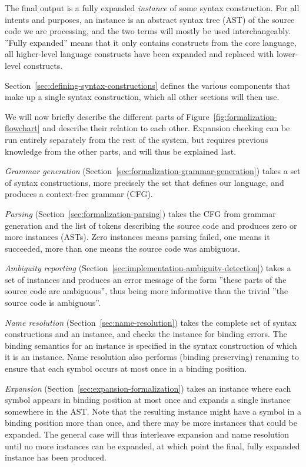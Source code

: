 \documentclass{kththesis}
\begin{document}
The final output is a fully expanded \emph{instance} of some syntax construction. For all intents and purposes, an instance is an abstract syntax tree (AST) of the source code we are processing, and the two terms will mostly be used interchangeably. ''Fully expanded'' means that it only contains constructs from the core language, all higher-level language constructs have been expanded and replaced with lower-level constructs.

Section~\ref{sec:defining-syntax-constructions} defines the various components that make up a single syntax construction, which all other sections will then use.

We will now briefly describe the different parts of Figure~\ref{fig:formalization-flowchart} and describe their relation to each other. Expansion checking can be run entirely separately from the rest of the system, but requires previous knowledge from the other parts, and will thus be explained last.

\emph{Grammar generation} (Section~\ref{sec:formalization-grammar-generation}) takes a set of syntax constructions, more precisely the set that defines our language, and produces a context-free grammar (CFG).

\emph{Parsing} (Section~\ref{sec:formalization-parsing}) takes the CFG from grammar generation and the list of tokens describing the source code and produces zero or more instances (ASTs). Zero instances means parsing failed, one means it succeeded, more than one means the source code was ambiguous.

\emph{Ambiguity reporting} (Section~\ref{sec:implementation-ambiguity-detection}) takes a set of instances and produces an error message of the form ''these parts of the source code are ambiguous'', thus being more informative than the trivial ''the source code is ambiguous''.

\emph{Name resolution} (Section~\ref{sec:name-resolution}) takes the complete set of syntax constructions and an instance, and checks the instance for binding errors. The binding semantics for an instance is specified in the syntax construction of which it is an instance. Name resolution also performs (binding preserving) renaming to ensure that each symbol occurs at most once in a binding position.

\emph{Expansion} (Section~\ref{sec:expansion-formalization}) takes an instance where each symbol appears in binding position at most once and expands a single instance somewhere in the AST. Note that the resulting instance might have a symbol in a binding position more than once, and there may be more instances that could be expanded. The general case will thus interleave expansion and name resolution until no more instances can be expanded, at which point the final, fully expanded instance has been produced.
\end{document}
